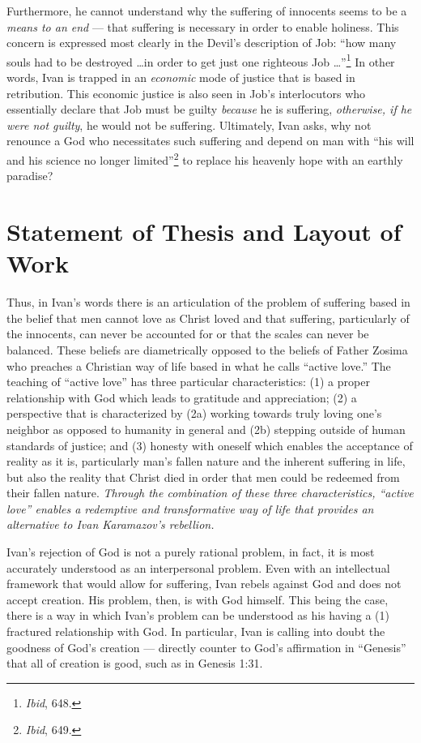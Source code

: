 Furthermore, he cannot understand why the suffering of innocents seems to be a \emph{means to an end} --- that suffering is necessary in order to enable holiness. This concern is expressed most clearly in the Devil's description of Job: ``how many souls had to be destroyed \ldots in order to get just one righteous Job \ldots''\footnote{\emph{Ibid}, 648.} In other words, Ivan is trapped in an \emph{economic} mode of justice that is based in retribution. This economic justice is also seen in Job's interlocutors who essentially declare that Job must be guilty \emph{because} he is suffering, \emph{otherwise, if he were not guilty}, he would not be suffering.  Ultimately, Ivan asks, why not renounce a God who necessitates such suffering and depend on man with ``his will and his science no longer limited''\footnote{\emph{Ibid}, 649.} to replace his heavenly hope with an earthly paradise?

\section{Statement of Thesis and Layout of Work}

Thus, in Ivan's words there is an articulation of the problem of suffering based in the belief that men cannot love as Christ loved and that suffering, particularly of the innocents, can never be accounted for or that the scales can never be balanced. These beliefs are diametrically opposed to the beliefs of Father Zosima who preaches a Christian way of life based in what he calls ``active love.'' The teaching of ``active love'' has three particular characteristics: (1) a proper relationship with God which leads to gratitude and appreciation; (2) a perspective that is characterized by (2a) working towards truly loving one's neighbor as opposed to humanity in general and (2b) stepping outside of human standards of justice; and (3) honesty with oneself which enables the acceptance of reality as it is, particularly man's fallen nature and the inherent suffering in life, but also the reality that Christ died in order that men could be redeemed from their fallen nature. \emph{Through the combination of these three characteristics, ``active love'' enables a redemptive and transformative way of life that provides an alternative to Ivan Karamazov's rebellion.}

Ivan's rejection of God is not a purely rational problem, in fact, it is most accurately understood as an interpersonal problem. Even with an intellectual framework that would allow for suffering, Ivan rebels against God and does not accept creation. His problem, then, is with God himself. This being the case, there is a way in which Ivan's problem can be understood as his having a (1) fractured relationship with God. In particular, Ivan is calling into doubt the goodness of God's creation --- directly counter to God's affirmation in ``Genesis'' that all of creation is good, such as in Genesis 1:31. 

